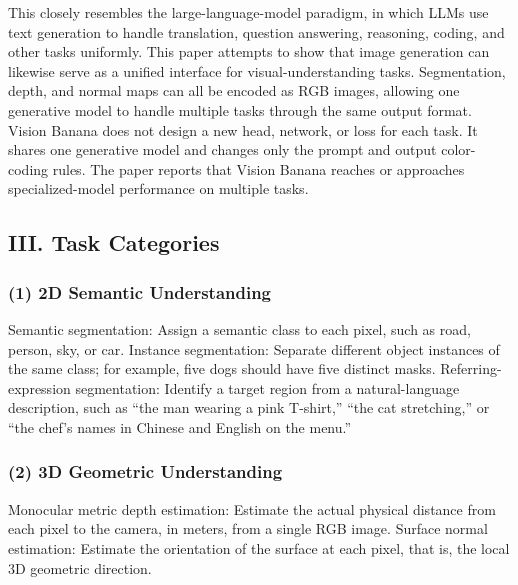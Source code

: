 This closely resembles the large-language-model paradigm, in which LLMs use text generation to handle translation, question answering, reasoning, coding, and other tasks uniformly. This paper attempts to show that image generation can likewise serve as a unified interface for visual-understanding tasks. Segmentation, depth, and normal maps can all be encoded as RGB images, allowing one generative model to handle multiple tasks through the same output format. Vision Banana does not design a new head, network, or loss for each task. It shares one generative model and changes only the prompt and output color-coding rules. The paper reports that Vision Banana reaches or approaches specialized-model performance on multiple tasks.

\hypertarget{iii.-task-categories}{%
\subsection{III. Task Categories}\label{iii.-task-categories}}

\hypertarget{d-semantic-understanding}{%
\subsubsection{(1) 2D Semantic Understanding}\label{d-semantic-understanding}}

Semantic segmentation: Assign a semantic class to each pixel, such as road, person, sky, or car.
Instance segmentation: Separate different object instances of the same class; for example, five dogs should have five distinct masks.
Referring-expression segmentation: Identify a target region from a natural-language description, such as ``the man wearing a pink T-shirt,'' ``the cat stretching,'' or ``the chef's names in Chinese and English on the menu.''

\hypertarget{d-geometric-understanding}{%
\subsubsection{(2) 3D Geometric Understanding}\label{d-geometric-understanding}}

Monocular metric depth estimation: Estimate the actual physical distance from each pixel to the camera, in meters, from a single RGB image.
Surface normal estimation: Estimate the orientation of the surface at each pixel, that is, the local 3D geometric direction.

